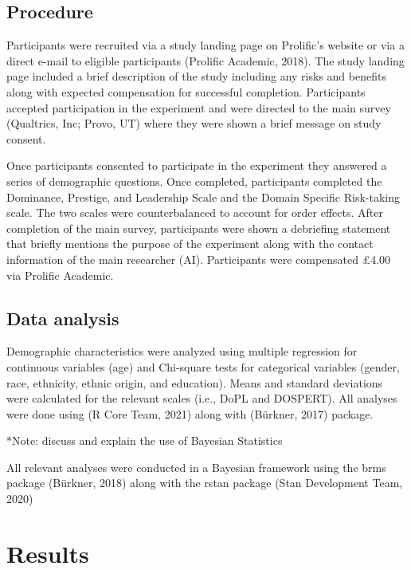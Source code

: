 \documentclass[
  english,
  a4paper,floatsintext]{apa7}
\begin{document}
\hypertarget{procedure}{%
\subsection{Procedure}\label{procedure}}

Participants were recruited via a study landing page on Prolific's website or via a direct e-mail to eligible participants (Prolific Academic, 2018). The study landing page included a brief description of the study including any risks and benefits along with expected compensation for successful completion. Participants accepted participation in the experiment and were directed to the main survey (Qualtrics, Inc; Provo, UT) where they were shown a brief message on study consent.

Once participants consented to participate in the experiment they answered a series of demographic questions. Once completed, participants completed the Dominance, Prestige, and Leadership Scale and the Domain Specific Risk-taking scale. The two scales were counterbalanced to account for order effects. After completion of the main survey, participants were shown a debriefing statement that briefly mentions the purpose of the experiment along with the contact information of the main researcher (AI). Participants were compensated £4.00 via Prolific Academic.

\hypertarget{data-analysis}{%
\subsection{Data analysis}\label{data-analysis}}

Demographic characteristics were analyzed using multiple regression for continuous variables (age) and Chi-square tests for categorical variables (gender, race, ethnicity, ethnic origin, and education). Means and standard deviations were calculated for the relevant scales (i.e., DoPL and DOSPERT). All analyses were done using (R Core Team, 2021) along with (Bürkner, 2017) package.

*Note: discuss and explain the use of Bayesian Statistics

All relevant analyses were conducted in a Bayesian framework using the brms package (Bürkner, 2018) along with the rstan package (Stan Development Team, 2020)

\hypertarget{results}{%
\section{Results}\label{results}}
\end{document}
